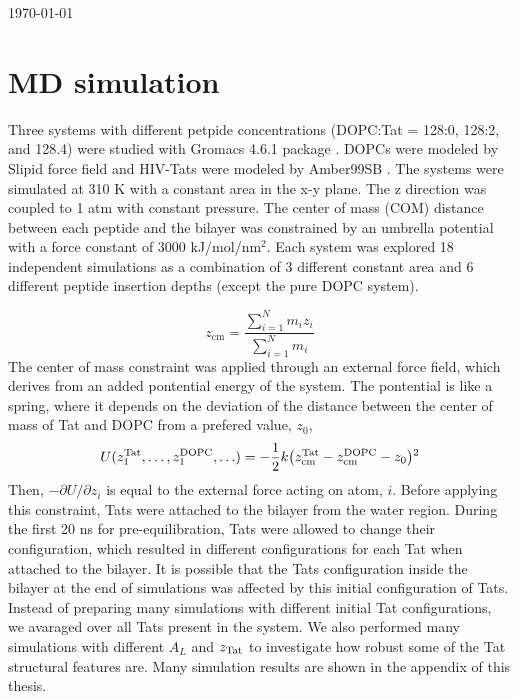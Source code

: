 \documentclass[12pt,letterpaper]{article}
\begin{document}
\today

\section{MD simulation}
Three systems with different petpide concentrations (DOPC:Tat = 128:0, 128:2, and 128.4)
were studied with Gromacs 4.6.1 package \cite{ref:Hess08}. DOPCs were modeled by Slipid 
force field \cite{ref:Jambeck12_JPCB,ref:Jambeck12_JCTC} and HIV-Tats
were modeled by Amber99SB \cite{ref:Hornak06}. The systems were simulated at 
310 K with a constant
area in the x-y plane. The z direction was coupled to 1 atm with constant pressure. The
center of mass (COM) distance between each peptide and the bilayer was constrained by an
umbrella potential with a force constant of 3000 kJ/mol/nm$^2$. Each system was explored
18 independent simulations as a combination of 3 different constant area and 6 different
peptide insertion depths (except the pure DOPC system).

\begin{equation}
  z_{\mathrm{cm}} = \frac{\sum\limits_{i=1}^N m_iz_i}{\sum\limits_{i=1}^N m_i}
\end{equation}
The center of mass constraint was applied through an external force field,
which derives from an added pontential energy of the system. The pontential 
is like a spring, where it depends on the deviation of the distance 
between the center of mass of Tat and DOPC from a prefered value, $z_0$,
\begin{equation}
  U(z_1^{\mathrm{Tat}},\ldots,z_1^{\mathrm{DOPC}},\ldots) = 
  -\frac{1}{2} k 
  \mathopen{}\left( z_{\mathrm{cm}}^{\mathrm{Tat}} - z_{\mathrm{cm}}^{\mathrm{DOPC}} - z_0 \right)\mathclose{}^2
\end{equation}
Then, $-\partial U/\partial z_i$ is equal to the external force acting 
on atom, $i$. Before applying this constraint, Tats were attached to 
the bilayer from the water region. During the first 20 ns for 
pre-equilibration, Tats were allowed to change their configuration,
which resulted in different configurations for each Tat when attached
to the bilayer. It is possible that the Tats configuration inside the
bilayer at the end of simulations was affected by this initial 
configuration of Tats. Instead of preparing many simulations with
different initial Tat configurations, we avaraged over all Tats
present in the system. We also performed many simulations with
different $A_L$ and $z_{\mathrm{Tat}}$ to investigate how robust some of the 
Tat structural features are. Many simulation results are shown in
the appendix of this thesis. 
\end{document}
